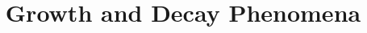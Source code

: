 \documentclass{beamer}
\title[MATH 2250 - Section 2.3]{Growth and Decay Phenomena}
\begin{document}
\begin{frame}
\titlepage
\end{frame}
\end{document}
